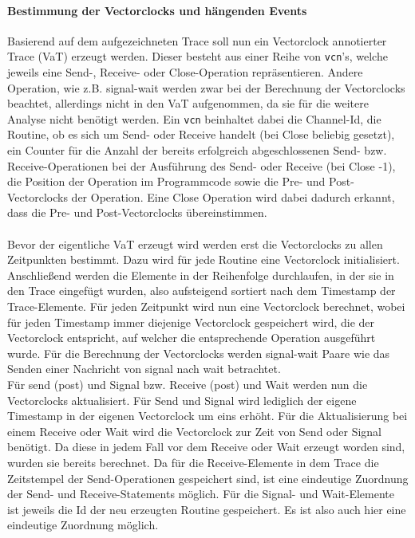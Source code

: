 \paragraph{Bestimmung der Vectorclocks und hängenden Events}
Basierend auf dem aufgezeichneten Trace soll nun ein Vectorclock annotierter Trace 
(VaT) erzeugt werden. Dieser besteht aus einer Reihe von \texttt{vcn}'s, 
welche jeweils eine Send-, Receive- oder Close-Operation repräsentieren.
Andere Operation, wie z.B. signal-wait werden zwar bei der Berechnung der Vectorclocks 
beachtet, allerdings nicht in den VaT aufgenommen, da sie für die weitere 
Analyse nicht benötigt werden. Ein \texttt{vcn} beinhaltet dabei die Channel-Id,
die Routine, ob es sich um Send- oder Receive handelt (bei Close beliebig gesetzt),
ein Counter für die Anzahl der bereits erfolgreich abgeschlossenen Send- bzw.
Receive-Operationen bei der Ausführung des Send- oder Receive (bei Close -1), 
die Position der Operation im Programmcode
sowie die Pre- und Post-Vectorclocks der Operation. Eine Close Operation 
wird dabei dadurch erkannt, dass die Pre- und Post-Vectorclocks übereinstimmen.\\\\
Bevor der eigentliche VaT erzeugt wird werden erst die Vectorclocks zu allen
Zeitpunkten bestimmt. Dazu wird für jede Routine eine Vectorclock initialisiert. 
Anschließend werden die Elemente in der Reihenfolge durchlaufen, in der sie 
in den Trace eingefügt wurden, also aufsteigend sortiert nach dem Timestamp 
der Trace-Elemente. Für jeden Zeitpunkt wird nun eine Vectorclock berechnet,
wobei für jeden Timestamp immer diejenige Vectorclock gespeichert wird, die 
der Vectorclock entspricht, auf welcher die entsprechende Operation ausgeführt wurde.
Für die Berechnung der Vectorclocks werden signal-wait Paare wie das Senden 
einer Nachricht von signal nach wait betrachtet.\\
Für send (post) und Signal bzw. Receive (post) und Wait werden nun die Vectorclocks 
aktualisiert.
Für Send und Signal wird lediglich der eigene Timestamp in der eigenen 
Vectorclock um eins erhöht. Für die Aktualisierung bei einem Receive oder Wait 
wird die Vectorclock zur Zeit von Send oder Signal benötigt. Da diese in jedem 
Fall vor dem Receive oder Wait erzeugt worden sind, wurden sie bereits berechnet.
Da für die Receive-Elemente in dem Trace die Zeitstempel der Send-Operationen 
gespeichert sind, ist eine eindeutige Zuordnung der Send- und Receive-Statements 
möglich. Für die Signal- und Wait-Elemente ist jeweils die Id der neu erzeugten 
Routine gespeichert. Es ist also auch hier eine eindeutige Zuordnung möglich. 
